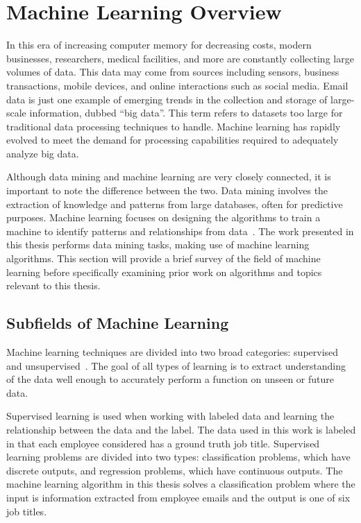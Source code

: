 \documentclass[12pt]{report}
\begin{document}
\section{Machine Learning Overview} \label{sec:MachineLearning}
In this era of increasing computer memory for decreasing costs, modern businesses, researchers, medical facilities, and more are constantly collecting large volumes of data.
This data may come from sources including sensors, business transactions, mobile devices, and online interactions such as social media.
Email data is just one example of emerging trends in the collection and storage of large-scale information, dubbed ``big data''.
This term refers to datasets too large for traditional data processing techniques to handle.
Machine learning has rapidly evolved to meet the demand for processing capabilities required to adequately analyze big data.

Although data mining and machine learning are very closely connected, it is important to note the difference between the two.
Data mining involves the extraction of knowledge and patterns from large databases, often for predictive purposes.
Machine learning focuses on designing the algorithms to train a machine to identify patterns and relationships from data~\cite{furnkranz2012foundations}.
The work presented in this thesis performs data mining tasks, making use of machine learning algorithms.
This section will provide a brief survey of the field of machine learning before specifically examining prior work on algorithms and topics relevant to this thesis.

\subsection{Subfields of Machine Learning}
Machine learning techniques are divided into two broad categories: supervised and unsupervised~\cite{barber2012bayesian}.
The goal of all types of learning is to extract understanding of the data well enough to accurately perform a function on unseen or future data.  

Supervised learning is used when working with labeled data and learning the relationship between the data and the label.
The data used in this work is labeled in that each employee considered has a ground truth job title.
Supervised learning problems are divided into two types: classification problems, which have discrete outputs, and regression problems, which have continuous outputs.
The machine learning algorithm in this thesis solves a classification problem where the input is information extracted from employee emails and the output is one of six job titles.
\end{document}
